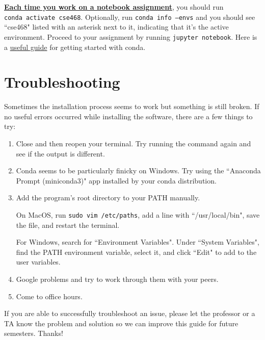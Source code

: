\documentclass[12pt]{article}
\begin{document}
\textbf{\underline{Each time you work on a notebook assignment}}, you should run \\ \texttt{conda activate cse468}. Optionally, run \texttt{conda info --envs} and you should see ``cse468" listed with an asterisk next to it, indicating that it's the active environment. Proceed to your assignment by running \texttt{jupyter notebook}. Here is a \href{https://docs.conda.io/projects/conda/en/latest/user-guide/getting-started.html}{useful guide} for getting started with conda.




\section{Troubleshooting}
Sometimes the installation process seems to work but something is still broken. If no useful errors occurred while installing the software, there are a few things to try:
\begin{enumerate}
\item Close and then reopen your terminal. Try running the command again and see if the output is different.
\item Conda seems to be particularly finicky on Windows. Try using the ``Anaconda Prompt (miniconda3)" app installed by your conda distribution.
\item Add the program's root directory to your PATH manually.

On MacOS, run \texttt{sudo vim /etc/paths}, add a line with ``/usr/local/bin", save the file, and restart the terminal.

For Windows, search for ``Environment Variables". Under ``System Variables", find the PATH environment variable, select it, and click ``Edit" to add to the user variables. 

\item Google problems and try to work through them with your peers.
\item Come to office hours.

\end{enumerate}

If you are able to successfully troubleshoot an issue, please let the professor or a TA know the problem and solution so we can improve this guide for future semesters. Thanks!
\end{document}
